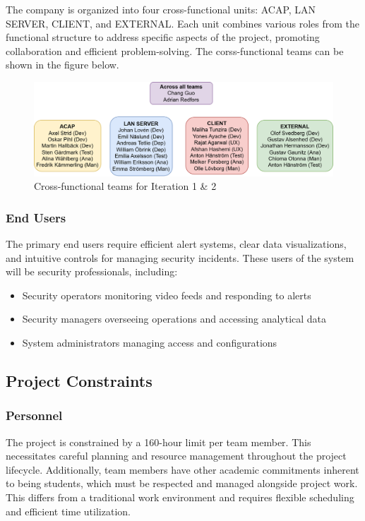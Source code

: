 The company is organized into four cross-functional units: ACAP, LAN SERVER, CLIENT, and EXTERNAL. Each unit combines various roles from the functional structure to address specific aspects of the project, promoting collaboration and efficient problem-solving. The corss-functional teams can be shown in the figure below.

\begin{figure}[h]
    \centering
    \includegraphics[width=0.5\linewidth]{NewCrossFunctional.drawio.png}
    \caption{Cross-functional teams for Iteration 1 \& 2}
    \label{fig:enter-label}
\end{figure}
    
\subsubsection{End Users}
The primary end users require efficient alert systems, clear data visualizations, and intuitive controls for managing security incidents. These users of the system will be security professionals, including:
    
\begin{itemize}
    \item Security operators monitoring video feeds and responding to alerts
    \item Security managers overseeing operations and accessing analytical data
    \item System administrators managing access and configurations
\end{itemize}
    

    
\subsection{Project Constraints}
    
\subsubsection{Personnel}
The project is constrained by a 160-hour limit per team member. This necessitates careful planning and resource management throughout the project lifecycle. Additionally, team members have other academic commitments inherent to being students, which must be respected and managed alongside project work. This differs from a traditional work environment and requires flexible scheduling and efficient time utilization.
    
